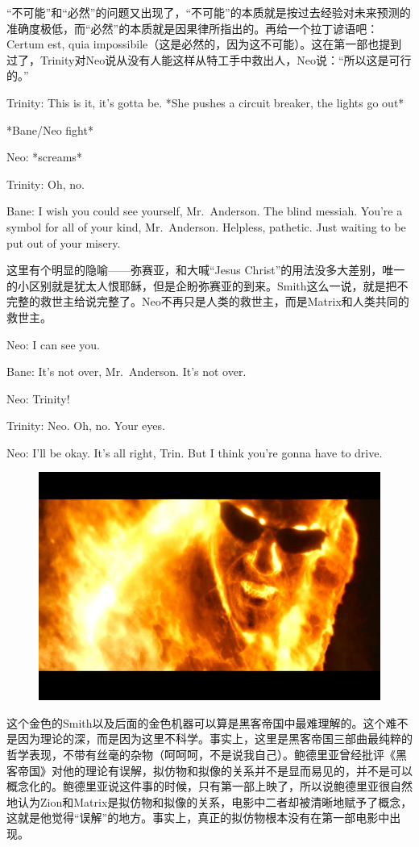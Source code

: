 \documentclass[UTF8]{ctexart}
\newenvironment{myquote}{\color{green} \setlength{\leftskip}{6em} \setlength{\rightskip}{4em} \setlength{\parindent}{-2em}}{\par}
\begin{document}
“不可能”和“必然”的问题又出现了，“不可能”的本质就是按过去经验对未来预测的准确度极低，而“必然”的本质就是因果律所指出的。再给一个拉丁谚语吧：Certum est, quia impossibile（这是必然的，因为这不可能）。这在第一部也提到过了，Trinity对Neo说从没有人能这样从特工手中救出人，Neo说：“所以这是可行的。”

\begin{myquote}
Trinity: This is it, it's gotta be. *She pushes a circuit breaker, the lights go out*

*Bane/Neo fight*

Neo: *screams*

Trinity: Oh, no.

Bane: I wish you could see yourself, Mr.~Anderson. The blind messiah. You're a symbol for all of your kind, Mr.~Anderson. Helpless, pathetic. Just waiting to be put out of your misery.
\end{myquote}

这里有个明显的隐喻——弥赛亚，和大喊“Jesus Christ”的用法没多大差别，唯一的小区别就是犹太人恨耶稣，但是企盼弥赛亚的到来。Smith这么一说，就是把不完整的救世主给说完整了。Neo不再只是人类的救世主，而是Matrix和人类共同的救世主。

\begin{myquote}
Neo: I can see you.

Bane: It's not over, Mr.~Anderson. It's not over.

Neo: Trinity!

Trinity: Neo. Oh, no. Your eyes.

Neo: I'll be okay. It's all right, Trin. But I think you're gonna have to drive.
\end{myquote}

\begin{figure}[htb]
\centering
\includegraphics[width=0.5\linewidth]{fig/f64563d00ca0378fa1ec9c63.jpg}
\end{figure}

这个金色的Smith以及后面的金色机器可以算是黑客帝国中最难理解的。这个难不是因为理论的深，而是因为这里不科学。事实上，这里是黑客帝国三部曲最纯粹的哲学表现，不带有丝毫的杂物（呵呵呵，不是说我自己）。鲍德里亚曾经批评《黑客帝国》对他的理论有误解，拟仿物和拟像的关系并不是显而易见的，并不是可以概念化的。鲍德里亚说这件事的时候，只有第一部上映了，所以说鲍德里亚很自然地认为Zion和Matrix是拟仿物和拟像的关系，电影中二者却被清晰地赋予了概念，这就是他觉得“误解”的地方。事实上，真正的拟仿物根本没有在第一部电影中出现。
\end{document}

